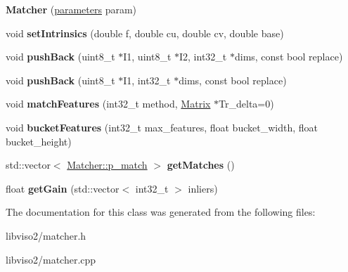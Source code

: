 \begin{DoxyCompactItemize}
\item 
\hypertarget{class_matcher_a9167728a8d5d7b58459617f3dc8327d4}{{\bfseries Matcher} (\hyperlink{struct_matcher_1_1parameters}{parameters} param)}\label{class_matcher_a9167728a8d5d7b58459617f3dc8327d4}

\item 
\hypertarget{class_matcher_a1f1f202db77fdf921369859d1abb936a}{void {\bfseries set\+Intrinsics} (double f, double cu, double cv, double base)}\label{class_matcher_a1f1f202db77fdf921369859d1abb936a}

\item 
\hypertarget{class_matcher_aeb3550e0e0299c0a4eaa3568be8b3812}{void {\bfseries push\+Back} (uint8\+\_\+t $\ast$I1, uint8\+\_\+t $\ast$I2, int32\+\_\+t $\ast$dims, const bool replace)}\label{class_matcher_aeb3550e0e0299c0a4eaa3568be8b3812}

\item 
\hypertarget{class_matcher_a1c3a8b99d8db17bd0f68a19b25562468}{void {\bfseries push\+Back} (uint8\+\_\+t $\ast$I1, int32\+\_\+t $\ast$dims, const bool replace)}\label{class_matcher_a1c3a8b99d8db17bd0f68a19b25562468}

\item 
\hypertarget{class_matcher_a6cd9e447ced1fa956b5195ebffc39ab7}{void {\bfseries match\+Features} (int32\+\_\+t method, \hyperlink{class_matrix}{Matrix} $\ast$Tr\+\_\+delta=0)}\label{class_matcher_a6cd9e447ced1fa956b5195ebffc39ab7}

\item 
\hypertarget{class_matcher_a95d20d0ed3360799d5f4a7d1a9e92d04}{void {\bfseries bucket\+Features} (int32\+\_\+t max\+\_\+features, float bucket\+\_\+width, float bucket\+\_\+height)}\label{class_matcher_a95d20d0ed3360799d5f4a7d1a9e92d04}

\item 
\hypertarget{class_matcher_ad78e8eb31fdba61a2f71336cd857bf72}{std\+::vector$<$ \hyperlink{struct_matcher_1_1p__match}{Matcher\+::p\+\_\+match} $>$ {\bfseries get\+Matches} ()}\label{class_matcher_ad78e8eb31fdba61a2f71336cd857bf72}

\item 
\hypertarget{class_matcher_a77572f934360dea32d3f9a30cfe6d908}{float {\bfseries get\+Gain} (std\+::vector$<$ int32\+\_\+t $>$ inliers)}\label{class_matcher_a77572f934360dea32d3f9a30cfe6d908}

\end{DoxyCompactItemize}


The documentation for this class was generated from the following files\+:\begin{DoxyCompactItemize}
\item 
libviso2/matcher.\+h\item 
libviso2/matcher.\+cpp\end{DoxyCompactItemize}
